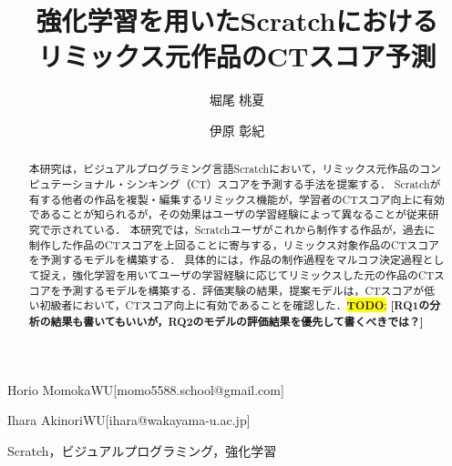 \documentclass[submit,techrep,noauthor]{ipsj}
\newcommand{\todo}[1]{\colorbox{yellow}{{\bf TODO}:}{\color{red} {\textbf{[#1]}}}}
\begin{document}
\title{強化学習を用いたScratchにおける\\
リミックス元作品のCTスコア予測}





\author{堀尾 桃夏}{Horio Momoka}{WU}[momo5588.school@gmail.com]
\author{伊原 彰紀}{Ihara Akinori}{WU}[ihara@wakayama-u.ac.jp]

\begin{abstract}
本研究は，ビジュアルプログラミング言語Scratchにおいて，リミックス元作品のコンピュテーショナル・シンキング（CT）スコアを予測する手法を提案する．
Scratchが有する他者の作品を複製・編集するリミックス機能が，学習者のCTスコア向上に有効であることが知られるが，その効果はユーザの学習経験によって異なることが従来研究で示されている．
本研究では，Scratchユーザがこれから制作する作品が，過去に制作した作品のCTスコアを上回ることに寄与する，リミックス対象作品のCTスコアを予測するモデルを構築する．
具体的には，作品の制作過程をマルコフ決定過程として捉え，強化学習を用いてユーザの学習経験に応じてリミックスした元の作品のCTスコアを予測するモデルを構築する．評価実験の結果，提案モデルは，CTスコアが低い初級者において，CTスコア向上に有効であることを確認した．\todo{RQ1の分析の結果も書いてもいいが，RQ2のモデルの評価結果を優先して書くべきでは？}
\end{abstract}


%
\begin{jkeyword}
    {Scratch，ビジュアルプログラミング，強化学習}
\end{jkeyword}
%

%

\maketitle
\end{document}
